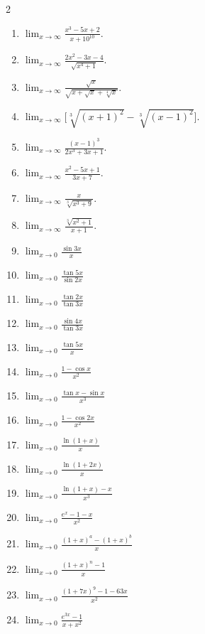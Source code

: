 \begin{multicols}{2}
\begin{enumerate}
\item $\displaystyle \lim_{x\to \infty} \frac{x^{3}-5x+2}{x+10^{10}}.$
\item $\displaystyle \lim_{x\to \infty} \frac{2x^{2}-3x-4}{\sqrt{x^{4}+1}}.$
\item $\displaystyle \lim_{x\to \infty} \frac{\sqrt{x}}{\sqrt{x+\sqrt{x}+\sqrt[4]{x}}}.$
\item $\displaystyle \lim_{x\to \infty} \big[\sqrt[3]{(x+1)^{2}}-\sqrt[3]{(x-1)^{2}}\big].$
\item $\displaystyle \lim_{x\to \infty} \frac{(x-1)^{3}}{2x^{3}+3x+1}.$
\item $\displaystyle \lim_{x\to \infty} \frac{x^{2}-5x+1}{3x+7}.$
\item $\displaystyle \lim_{x\to \infty} \frac{x}{\sqrt[3]{x^{3}+9}}.$
\item $\displaystyle \lim_{x\to \infty} \frac{\sqrt[3]{x^{2}+1}}{x+1}.$
\item $\displaystyle \lim_{x\to 0}\frac{\sin 3x}{x}$
\item $\displaystyle \lim_{x\to 0}\frac{\tan 5x}{\sin 2x}$
\item $\displaystyle \lim_{x\to 0}\frac{\tan 2x}{\tan 3x}$
\item $\displaystyle \lim_{x\to 0}\frac{\sin 4x}{\tan 3x}$
\item $\displaystyle \lim_{x\to 0}\frac{\tan 5x}{x}$
\item $\displaystyle \lim_{x\to 0}\frac{1-\cos x}{x^{2}}$
\item $\displaystyle \lim_{x\to 0}\frac{\tan x-\sin x}{x^{3}}$
\item $\displaystyle \lim_{x\to 0}\frac{1-\cos 2x}{x^{2}}$
\item $\displaystyle \lim_{x\to 0}\frac{\ln(1+x)}{x}$
\item $\displaystyle \lim_{x\to 0}\frac{\ln(1+2x)}{x}$
\item $\displaystyle \lim_{x\to 0}\frac{\ln(1+x)-x}{x^{3}}$
\item $\displaystyle \lim_{x\to 0}\frac{e^{x}-1-x}{x^{2}}$
\item $\displaystyle \lim_{x\to 0}\frac{(1+x)^{a}-(1+x)^{b}}{x}$
\item $\displaystyle \lim_{x\to 0}\frac{(1+x)^{n}-1}{x}$
\item $\displaystyle \lim_{x\to 0}\frac{(1+7x)^{9}-1-63x}{x^{2}}$
\item $\displaystyle \lim_{x\to 0}\frac{e^{3x}-1}{x+x^{2}}$
\end{enumerate}
\end{multicols}
